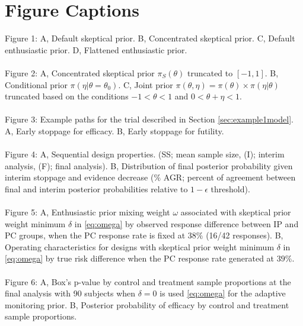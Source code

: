 \documentclass[12pt]{article}
\begin{document}
\newpage
\section*{Figure Captions}
Figure 1: {A, Default skeptical prior. B, Concentrated skeptical prior. C, Default enthusiastic prior. D, Flattened enthusiastic prior.}
\\\\
Figure 2: {A, Concentrated skeptical prior $\pi_S(\theta)$ truncated to $[-1,1]$. B, Conditional prior $\pi(\eta|\theta=\theta_0)$. C, Joint prior $\pi(\theta,\eta)=\pi(\theta)\times\pi(\eta|\theta)$ truncated based on the conditions $-1<\theta<1$ and $0<\theta+\eta<1$.}
\\\\
Figure 3: {Example paths for the trial described in Section \ref{sec:example1model}. A, Early stoppage for efficacy. B, Early stoppage for futility.}
\\\\
Figure 4: {A, Sequential design properties. (SS; mean sample size, (I); interim analysis, (F); final analysis). B, Distribution of final posterior probability given interim stoppage and evidence decrease ($\%$ AGR; percent of agreement between final and interim posterior probabilities relative to $1-\epsilon$ threshold).}
\\\\
Figure 5: {A, Enthusiastic prior mixing weight $\omega$ associated with skeptical prior weight minimum $\delta$ in \eqref{eq:omega} by observed response difference between IP and PC groups, when the PC response rate is fixed at $38\%$ (16/42 responses). B, Operating characteristics for designs with skeptical prior weight minimum $\delta$ in \eqref{eq:omega} by true risk difference when the PC response rate generated at $39\%$.}
\\\\
Figure 6: {A, Box's p-value by control and treatment sample proportions at the final analysis with 90 subjects when $\delta=0$ is used \eqref{eq:omega} for the adaptive monitoring prior. B, Posterior probability of efficacy by control and treatment sample proportions.}
\end{document}
